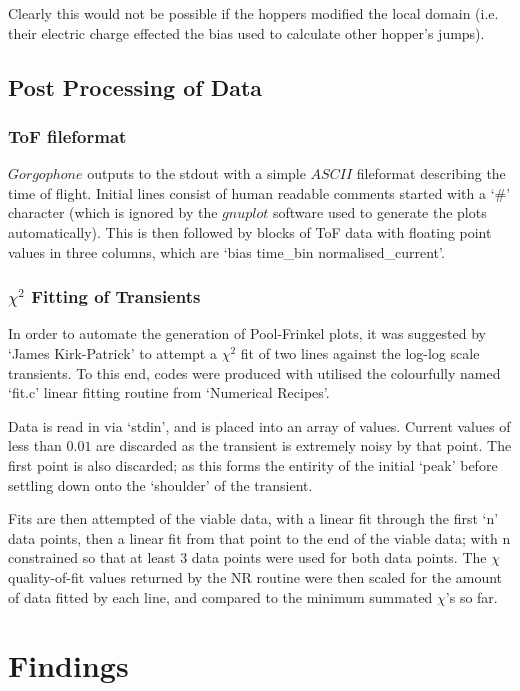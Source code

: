 \documentclass[twocolumn,a4,notitlepage]{report}
\begin{document}
Clearly this would not be possible if the hoppers modified the local domain
(i.e. their electric charge effected the bias used to calculate other
hopper's jumps).

\section{Post Processing of Data}

\subsection{ToF fileformat}

$Gorgophone$ outputs to the stdout with a simple $ASCII$ fileformat
describing the time of flight. Initial lines consist of human readable
comments started with a `\#' character (which is ignored by the $gnuplot$
software used to generate the plots automatically). This is then followed by
blocks of ToF data with floating point values in three columns, which are
`bias time\_bin normalised\_current'.

\subsection{$\chi ^2$ Fitting of Transients}

In order to automate the generation of Pool-Frinkel plots, it was suggested
by `James Kirk-Patrick' to attempt a $\chi ^2$ fit of two lines against the
log-log scale transients. To this end,  codes were
produced with utilised the colourfully named `fit.c' linear fitting routine
from `Numerical Recipes'. 

Data is read in via `stdin', and is placed into an array of values. Current values
of less than $0.01$ are discarded as the transient is extremely noisy by that
point. The first point is also discarded; as this forms the entirity of the
initial `peak' before settling down onto the `shoulder' of the transient.

Fits are then attempted of the viable data, with a linear fit through the
first `n' data points, then a linear fit from that point to the end of the
viable data; with n constrained so that at least 3 data points were used for
both data points. The $\chi$ quality-of-fit values returned by the NR
routine were then scaled for the amount of data fitted by each line, and
compared to the minimum summated $\chi$'s so far. 

\chapter{Findings}
\end{document}
